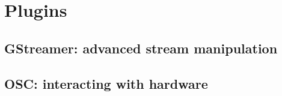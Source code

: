 \chapter{Plugins}
\section{GStreamer: advanced stream manipulation}

\section{OSC: interacting with hardware}
